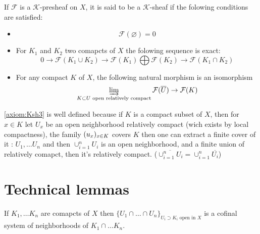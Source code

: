 \begin{definition}\label{def:K_sheaves}
    If $\mathcal{F}$ is a $\mathcal{K}$-presheaf on $X$, it is said to be a $\mathcal{K}$-sheaf if the folowing conditions are satisfied:\begin{itemize}
    \item\begin{equation}\label{axiom:Ksh1}
        \mathcal{F}(\varnothing)=0
    \end{equation}
    \item For $K_1$ and $K_2$ two comapcts of $X$ the folowing sequence is exact:\begin{equation}\label{axiom:Ksh2}
         0\to\mathcal{F}(K_1\cup K_2)\to \mathcal{F}(K_1)\bigoplus\mathcal{F}(K_2)\to \mathcal{F}(K_1\cap K_2) 
    \end{equation}
    \item For any compact $K$ of $X$, the following natural morphism is an isomorphism\begin{equation}\label{axiom:Ksh3}
        \varinjlim\limits_{K\subset U\text{ open relatively compact}}\mathcal{F}(\overline{U})\to \mathcal{F}(K)
    \end{equation}
\end{itemize}
\end{definition}

\begin{remark}
    \eqref{axiom:Ksh3} is well defined because if $K$ is a compact subset of $X$, then for $x\in K$ let $U_x$ be an open neighborhood relatively compact (wich exists by local compactness), the family $(u_x)_{x\in K}$ covers $K$ then one can extract a finite cover of it : $U_1,\ldots U_n$ and then $\cup_{i=1}^n U_i$ is an open neighborhood, and a finite union of relatively comapct, then it's relatively compact. ($\overline{\cup_{i=1}^n U_i}=\cup_{i=1}^n \overline{U_i}$)
\end{remark}


\section{Technical lemmas}

\begin{lemma}\label{lem:cofinal_syst_of_inter_compact}
    If $K_1,\ldots K_n$ are comapcts of $X$ then $\{U_1\cap\ldots\cap U_n\}_{U_i\supset K_i\text{ open in }X}$ is a cofinal system of neighborhoods of $K_1\cap \ldots K_n$.
\end{lemma}

